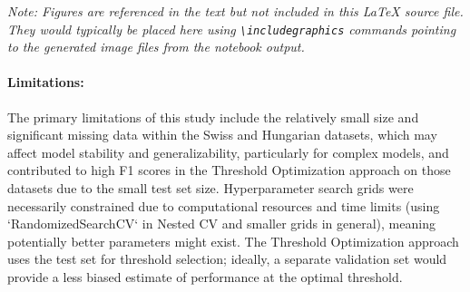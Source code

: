 \documentclass{article}
\begin{document}



\textit{Note: Figures are referenced in the text but not included in this LaTeX source file. They would typically be placed here using \texttt{\textbackslash includegraphics} commands pointing to the generated image files from the notebook output.}

\paragraph{Limitations:}
The primary limitations of this study include the relatively small size and significant missing data within the Swiss and Hungarian datasets, which may affect model stability and generalizability, particularly for complex models, and contributed to high F1 scores in the Threshold Optimization approach on those datasets due to the small test set size. Hyperparameter search grids were necessarily constrained due to computational resources and time limits (using `RandomizedSearchCV` in Nested CV and smaller grids in general), meaning potentially better parameters might exist. The Threshold Optimization approach uses the test set for threshold selection; ideally, a separate validation set would provide a less biased estimate of performance at the optimal threshold.
\end{document}
